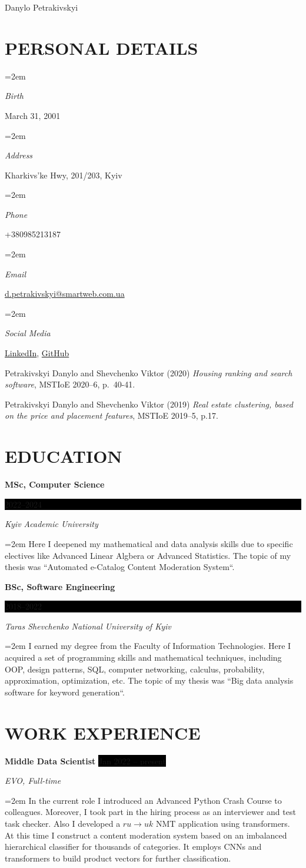 \documentclass[paper=a4,fontsize=11pt]{scrartcl}
\newcommand{\sepspace}{\vspace*{1em}}
\newcommand{\MyName}[1]{
    \Huge \usefont{OT1}{phv}{b}{n} \hfill #1
    \par \normalsize \normalfont}
\newcommand{\NewPart}[1]{\section*{\uppercase{#1}}}
\newcommand{\PersonalEntry}[2]{
    \noindent\hangindent=2em\hangafter=0
    \parbox{6em}{\textit{#1}}
    \hspace{1.5em} #2 \par}
\newcommand{\EducationEntry}[4]{
    \noindent \textbf{#1} \hfill
    \colorbox{Black}{\parbox{6em}{\hfill\color{White}#2}} \par
    \noindent \textit{#3} \par
    \noindent\hangindent=2em\hangafter=0 \small #4
    \normalsize \par}
\newcommand{\WorkEntry}[4]{
    \noindent \textbf{#1} \hfill
    \colorbox{Black}{\color{White}#2} \par
    \noindent \textit{#3} \par
    \noindent\hangindent=2em\hangafter=0 \small #4
    \normalsize \par}
\begin{document}
    \MyName{Danylo Petrakivskyi}

    \sepspace

    \NewPart{Personal details}{}

    \PersonalEntry{Birth}{March 31, 2001}
    \PersonalEntry{Address}{Kharkivs'ke Hwy, 201/203, Kyiv}
    \PersonalEntry{Phone}{+380985213187}
    \PersonalEntry{Email}{\url{d.petrakivskyi@smartweb.com.ua}}
    \PersonalEntry{Social Media}{\href{https://www.linkedin.com/in/danylo-petrakivskyi-916665174/}{LinkedIn},
        \href{https://github.com/xXxRisingTidexXx/}{GitHub}}

    \begin{thebibliography}{9}
        Petrakivskyi Danylo and Shevchenko Viktor (2020) \emph{Housing ranking and search software}, MSTIoE 2020--6,
        p.~40-41.

        Petrakivskyi Danylo and Shevchenko Viktor (2019) \emph{Real estate clustering, based on the price and placement
        features}, MSTIoE 2019--5, p.17.
    \end{thebibliography}

    \NewPart{Education}{}

    \EducationEntry{MSc, Computer Science}{2022--2024}{Kyiv Academic University}{Here I deepened my mathematical and
    data analysis skills due to specific electives like Advanced Linear Algbera or Advanced Statistics. The topic of
    my thesis was ``Automated e-Catalog Content Moderation System``.}
    \sepspace

    \EducationEntry{BSc, Software Engineering}{2018--2022}{Taras Shevchenko National University of Kyiv}{I earned my
    degree from the Faculty of Information Technologies. Here I acquired a set of programming skills and mathematical
    techniques, including OOP, design patterns, SQL, computer networking, calculus, probability, approximation,
        optimization, etc. The topic of my thesis was ``Big data analysis software for keyword generation``.}

    \NewPart{Work experience}{}

    \WorkEntry{Middle Data Scientist}{Jan 2022 -- present}{EVO, Full-time}{In the current role I introduced an Advanced
    Python Crash Course to colleagues. Moreover, I took part in the hiring process as an interviewer and test task
    checker. Also I developed a $ru \rightarrow uk$ NMT application using transformers. At this time I construct a
    content moderation system based on an imbalanced hierarchical classifier for thousands of categories. It employs
    CNNs and transformers to build product vectors for further classification.}
\end{document}
